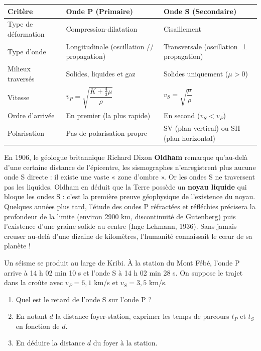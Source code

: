 \documentclass[11pt]{article}
\begin{document}
\begin{center}
\begin{tabularx}{\linewidth}{|l|X|X|}
\hline
\rowcolor{popblueL} \textbf{Critère} & \textbf{Onde P (Primaire)} & \textbf{Onde S (Secondaire)} \\
\hline
Type de déformation & Compression-dilatation & Cisaillement \\
\hline
Type d'onde & Longitudinale (oscillation // propagation) & Transversale (oscillation $\perp$ propagation) \\
\hline
Milieux traversés & Solides, liquides et gaz & Solides uniquement ($\mu > 0$) \\
\hline
Vitesse & $v_P = \sqrt{\dfrac{K + \frac{4}{3}\mu}{\rho}}$ & $v_S = \sqrt{\dfrac{\mu}{\rho}}$ \\
\hline
Ordre d'arrivée & En premier (la plus rapide) & En second ($v_S < v_P$) \\
\hline
Polarisation & Pas de polarisation propre & SV (plan vertical) ou SH (plan horizontal) \\
\hline
\end{tabularx}
\end{center}

\begin{savaistu}
En 1906, le géologue britannique Richard Dixon \textbf{Oldham} remarque qu'au-delà d'une certaine distance de l'épicentre, les sismographes n'enregistrent plus aucune onde S directe : il existe une vaste « zone d'ombre ». Or les ondes S ne traversent pas les liquides. Oldham en déduit que la Terre possède un \textbf{noyau liquide} qui bloque les ondes S : c'est la première preuve géophysique de l'existence du noyau. Quelques années plus tard, l'étude des ondes P réfractées et réfléchies précisera la profondeur de la limite (environ 2900 km, discontinuité de Gutenberg) puis l'existence d'une graine solide au centre (Inge Lehmann, 1936). Sans jamais creuser au-delà d'une dizaine de kilomètres, l'humanité connaissait le cœur de sa planète !
\end{savaistu}

\begin{exercice}
Un séisme se produit au large de Kribi. À la station du Mont Fébé, l'onde P arrive à 14 h 02 min 10 s et l'onde S à 14 h 02 min 28 s. On suppose le trajet dans la croûte avec $v_P = 6{,}1$ km/s et $v_S = 3{,}5$ km/s.
\begin{enumerate}
\item Quel est le retard de l'onde S sur l'onde P ?
\item En notant $d$ la distance foyer-station, exprimer les temps de parcours $t_P$ et $t_S$ en fonction de $d$.
\item En déduire la distance $d$ du foyer à la station.
\end{enumerate}
\end{exercice}
\end{document}
